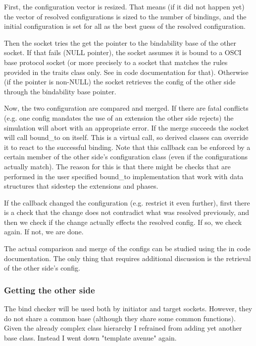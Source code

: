 \documentclass[a4paper,10pt]{article}          %
\newcommand{\code}[1]{{\ttfamily#1}}
\begin{document}
First, the configuration vector is resized. That means (if it did not happen yet) the vector of resolved configurations is sized to the number of bindings, and the initial configuration is set for all as the best guess of the resolved configuration.

Then the socket tries the get the pointer to the bindability base of the other socket. If that fails (NULL pointer), the socket assumes it is bound to a OSCI base protocol socket (or more precisely to a socket that matches the rules provided in the traits class only. See in code documentation for that). Otherwise (if the pointer is non-NULL) the socket retrieves the config of the other side through the bindability base pointer.

Now, the two configuration are compared and merged. If there are fatal conflicts (e.g. one config mandates the use of an extension the other side rejects) the simulation will abort with an appropriate error. If the merge succeeds the socket will call \code{bound\_to} on itself. This is a virtual call, so derived classes can override it to react to the successful binding. Note that this callback can be enforced by a certain member of the other side's configuration class (even if the configurations actually match). The reason for this is that there might be checks that are performed in the user specified \code{bound\_to} implementation that work with data structures that sidestep the extensions and phases.

If the callback changed the configuration (e.g. restrict it even further), first there is a check that the change does not contradict what was resolved previously, and then we check if the change actually effects the resolved config. If so, we check again. If not, we are done.

The actual comparison and merge of the configs can be studied using the in code documentation. The only thing that requires additional discussion is the retrieval of the other side's config.

\subsubsection{Getting the other side}

The bind checker will be used both by initiator and target sockets. However, they do not share a common base (although they share some common functions). Given the already complex class hierarchy I refrained from adding yet another base class. Instead I went down "template avenue" again.
\end{document}
